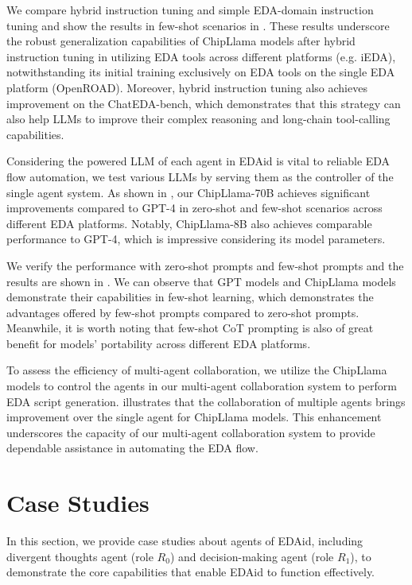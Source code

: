 We compare hybrid instruction tuning and simple EDA-domain instruction tuning and show the results in few-shot scenarios in .
These results underscore the robust generalization capabilities of ChipLlama models after hybrid instruction tuning in utilizing EDA tools across different platforms (e.g. iEDA), notwithstanding its initial training exclusively on EDA tools on the single EDA platform (OpenROAD). 
Moreover, hybrid instruction tuning also achieves improvement on the ChatEDA-bench, which demonstrates that this strategy can also help LLMs to improve their complex reasoning and long-chain tool-calling capabilities.

Considering the powered LLM of each agent in EDAid is vital to reliable EDA flow automation, we test various LLMs by serving them as the controller of the single agent system.
As shown in , our ChipLlama-70B achieves significant improvements compared to GPT-4 in zero-shot and few-shot scenarios across different EDA platforms.
Notably, ChipLlama-8B also achieves comparable performance to GPT-4, which is impressive considering its model parameters.

We verify the performance with zero-shot prompts and few-shot prompts and the results are shown in .
We can observe that GPT models and ChipLlama models demonstrate their capabilities in few-shot learning, which demonstrates the advantages offered by few-shot prompts compared to zero-shot prompts.
Meanwhile, it is worth noting that few-shot CoT prompting is also of great benefit for models' portability across different EDA platforms.

To assess the efficiency of multi-agent collaboration, we utilize the ChipLlama models to control the agents in our multi-agent collaboration system to perform EDA script generation.
 illustrates that the collaboration of multiple agents brings improvement over the single agent for ChipLlama models. 
This enhancement underscores the capacity of our multi-agent collaboration system to provide dependable assistance in automating the EDA flow.


\section{Case Studies}
In this section, we provide case studies about agents of EDAid, including divergent thoughts agent (role $R_{0}$) and decision-making agent (role $R_{1}$), to demonstrate the core capabilities that enable EDAid to function effectively.

